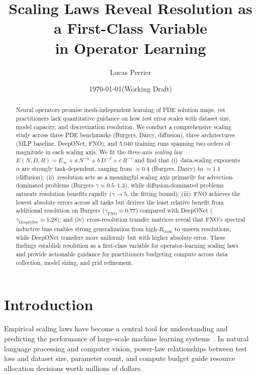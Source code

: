 \documentclass[11pt]{article}
\title{%
  Scaling Laws Reveal Resolution as a First-Class Variable \\
  in Operator Learning%
}
\author{Lucas Perrier}
\date{\today \quad (Working Draft)}
\newcommand{\Einf}{E_\infty}
\newcommand{\Rtrain}{R_{\mathrm{train}}}
\begin{document}
\maketitle

\begin{abstract}
Neural operators promise mesh-independent learning of PDE solution maps, yet
practitioners lack quantitative guidance on how test error scales with dataset
size, model capacity, and discretization resolution. We conduct a
comprehensive scaling study across three PDE benchmarks (Burgers, Darcy,
diffusion), three architectures (MLP baseline, DeepONet, FNO), and 5{,}040
training runs spanning two orders of magnitude in each scaling axis. We fit
the \emph{three-axis scaling law}
$E(N,D,R) = \Einf + a\,N^{-\alpha} + b\,D^{-\beta} + c\,R^{-\gamma}$
and find that (i)~data-scaling exponents $\alpha$ are strongly
task-dependent, ranging from $\approx 0.4$ (Burgers, Darcy) to
$\approx 1.1$ (diffusion); (ii)~resolution acts as a meaningful
scaling axis primarily for advection-dominated problems (Burgers $\gamma
\approx 0.5$--$1.3$), while diffusion-dominated problems saturate
resolution benefits rapidly ($\gamma \to 5$, the fitting bound);
(iii)~FNO achieves the lowest absolute errors across all tasks but
derives the least relative benefit from additional resolution on
Burgers ($\gamma_{\mathrm{FNO}} \approx 0.77$) compared with DeepONet
($\gamma_{\mathrm{DeepONet}} \approx 1.28$); and (iv)~cross-resolution
transfer matrices reveal that FNO's spectral inductive bias enables
strong generalization from high-$\Rtrain$ to unseen resolutions,
while DeepONet transfers more uniformly but with higher absolute error.
These findings establish resolution as a first-class variable for
operator-learning scaling laws and provide actionable guidance for
practitioners budgeting compute across data collection, model sizing,
and grid refinement.
\end{abstract}

\section{Introduction}
\label{sec:intro}

Empirical scaling laws have become a central tool for understanding and
predicting the performance of large-scale machine learning
systems~\citep{kaplan2020scaling,hoffmann2022training}. In natural
language processing and computer vision, power-law relationships between
test loss and dataset size, parameter count, and compute budget guide
resource allocation decisions worth millions of dollars.
\end{document}
